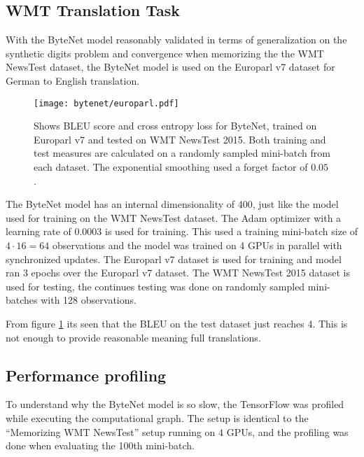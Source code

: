 \clearpage
\subsection{WMT Translation Task}

With the ByteNet model reasonably validated in terms of generalization on the synthetic digits problem and convergence when memorizing the the WMT NewsTest dataset, the ByteNet model is used on the Europarl v7 dataset for German to English translation.

\begin{figure}[h]
    \centering
    \texttt{[image: bytenet/europarl.pdf]}
    \caption{Shows BLEU score and cross entropy loss for ByteNet, trained on Europarl v7 and tested on WMT NewsTest 2015. Both training and test measures are calculated on a randomly sampled mini-batch from each dataset. The exponential smoothing used a forget factor of $0.05$.}
    \label{fig:result:bytenet:europarl}
\end{figure}

The ByteNet model has an internal dimensionality of 400, just like the model used for training on the WMT NewsTest dataset. The Adam optimizer with a learning rate of 0.0003 is used for training. This used a training mini-batch size of $4 \cdot 16 = 64$ observations and the model was trained on 4 GPUs in parallel with synchronized updates. The Europarl v7 dataset is used for training and model ran 3 epochs over the Europarl v7 dataset. The WMT NewsTest 2015 dataset is used for testing, the continues testing was done on randomly sampled mini-batches with 128 observations.

From figure \ref{fig:result:bytenet:europarl} its seen that the BLEU on the test dataset just reaches 4. This is not enough to provide reasonable meaning full translations.


\clearpage
\subsection{Performance profiling}
To understand why the ByteNet model is so slow, the TensorFlow was profiled while executing the computational graph. The setup is identical to the ``Memorizing WMT NewsTest'' setup running on 4 GPUs, and the profiling was done when evaluating the 100th mini-batch. 

